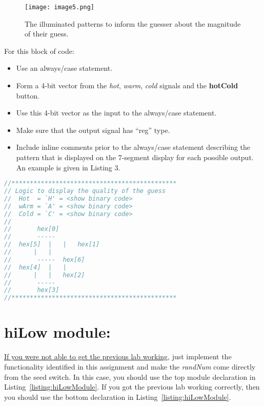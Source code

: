 \begin{figure}
\texttt{[image:  image5.png]}
\caption{The illuminated patterns to inform the guesser about the magnitude of their guess.}
\label{figure:hiLoHintSevenSeg}
\end{figure}

For this block of code:

\begin{itemize}
\item
  Use an always/case statement.
\item
  Form a 4-bit vector from the \emph{hot}, \emph{warm}, \emph{cold}
  signals and the \textbf{hotCold} button.
\item
  Use this 4-bit vector as the input to the always/case statement.
\item
  Make sure that the output signal has ``reg'' type.
\item
  Include inline comments prior to the always/case statement describing
  the pattern that is displayed on the 7-segment display for each
  possible output. An example is given in Listing 3.
\end{itemize}

\begin{lstlisting}[language=Verilog,
 caption={A comment block describing the pattern of illuminated segment for each guess hint..},
 label={listing:hotColdGuess},
 frame=single]
//*********************************************
// Logic to display the quality of the guess
//	Hot  = `H' = <show binary code>
//	wArm = `A' = <show binary code>
//	Cold = `C' = <show binary code>
//
//		 hex[0]
//		 -----
//	hex[5]	|	|	hex[1]
//		|	|	
//		 -----	hex[6]
//	hex[4]	|	|
//		|	|	hex[2]
//		 -----
//		 hex[3]
//*********************************************
\end{lstlisting}

\hypertarget{hilow-module}{%
\section{hiLow module:}\label{hilow-module}}

\uline{If you were not able to get the previous lab working}, just
implement the functionality identified in this assignment and make the
\emph{randNum} come directly from the seed switch. In this case, you
should use the top module declaration in Listing~\ref{listing:hiLowModule}. If you got the
previous lab working correctly, then you should use the bottom
declaration in Listing~\ref{listing:hiLowModule}.




